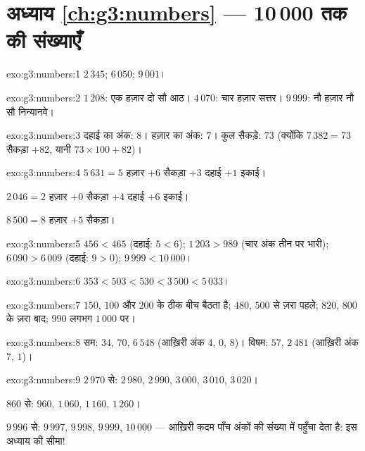 \section*{अध्याय \ref{ch:g3:numbers} --- 10\,000 तक की संख्याएँ}

\begin{solution}{exo:g3:numbers:1}
$2\,345$; \quad $6\,050$; \quad $9\,001$।
\end{solution}

\begin{solution}{exo:g3:numbers:2}
$1\,208$: एक हज़ार दो सौ आठ। \quad
$4\,070$: चार हज़ार सत्तर। \quad
$9\,999$: नौ हज़ार नौ सौ निन्यानवे।
\end{solution}

\begin{solution}{exo:g3:numbers:3}
दहाई का अंक: $8$। हज़ार का अंक: $7$। कुल सैकड़े:
$73$ (क्योंकि $7\,382 = 73$ सैकड़ा $+ 82$, यानी
$73 \times 100 + 82$)।
\end{solution}

\begin{solution}{exo:g3:numbers:4}
$5\,631 = 5$ हज़ार $+ 6$ सैकड़ा $+ 3$ दहाई $+ 1$ इकाई।

$2\,046 = 2$ हज़ार $+ 0$ सैकड़ा $+ 4$ दहाई $+ 6$ इकाई।

$8\,500 = 8$ हज़ार $+ 5$ सैकड़ा।
\end{solution}

\begin{solution}{exo:g3:numbers:5}
$456 < 465$ (दहाई: $5 < 6$); \quad
$1\,203 > 989$ (चार अंक तीन पर भारी); \quad
$6\,090 > 6\,009$ (दहाई: $9 > 0$); \quad
$9\,999 < 10\,000$।
\end{solution}

\begin{solution}{exo:g3:numbers:6}
$353 < 503 < 530 < 3\,500 < 5\,033$।
\end{solution}

\begin{solution}{exo:g3:numbers:7}
$150$, $100$ और $200$ के ठीक बीच बैठता है; $480$, $500$ से
ज़रा पहले; $820$, $800$ के ज़रा बाद; $990$ लगभग $1\,000$ पर।
\end{solution}

\begin{solution}{exo:g3:numbers:8}
सम: $34$, $70$, $6\,548$ (आख़िरी अंक $4$, $0$, $8$)। विषम: $57$,
$2\,481$ (आख़िरी अंक $7$, $1$)।
\end{solution}

\begin{solution}{exo:g3:numbers:9}
$2\,970$ से: $2\,980$, $2\,990$, $3\,000$, $3\,010$, $3\,020$।

$860$ से: $960$, $1\,060$, $1\,160$, $1\,260$।

$9\,996$ से: $9\,997$, $9\,998$, $9\,999$, $10\,000$ --- आख़िरी
कदम पाँच अंकों की संख्या में पहुँचा देता है: इस अध्याय की सीमा!
\end{solution}


